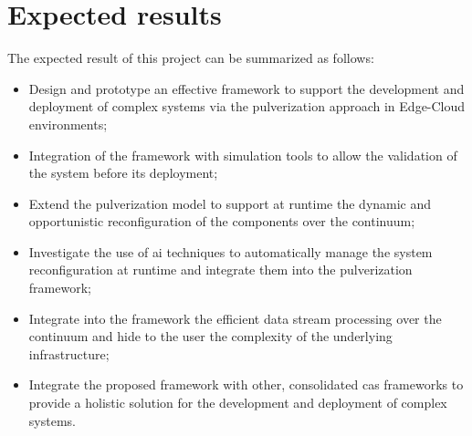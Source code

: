 \documentclass[12pt,a4paper]{article}
\begin{document}

\section{Expected results}\label{sec:expected-results}

The expected result of this project can be summarized as follows:

\begin{itemize}
	\item Design and prototype an effective framework to support the development and deployment of complex systems
		via the pulverization approach in Edge-Cloud environments;
	\item Integration of the framework with simulation tools to allow the validation of the system before its deployment;
	\item Extend the pulverization model to support at runtime the dynamic and opportunistic reconfiguration of the components over the continuum;
	\item Investigate the use of \ac{ai} techniques to automatically manage the system reconfiguration at runtime and integrate them into the pulverization framework;
	\item Integrate into the framework the efficient data stream processing over the continuum and hide to the user the complexity of the underlying infrastructure;
	\item Integrate the proposed framework with other, consolidated \ac{cas} frameworks
		to provide a holistic solution for the development and deployment of complex systems.
\end{itemize}


\end{document}
